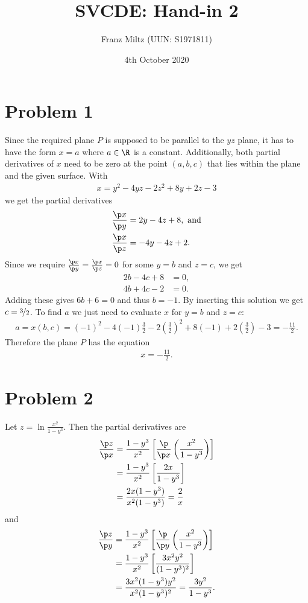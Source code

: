 \documentclass{article}
\begin{document}
\title{SVCDE: Hand-in 2}
\author{Franz Miltz (UUN: S1971811)}
\date{4th October 2020}
\maketitle
\section*{Problem 1}
Since the required plane $P$ is supposed to be parallel to the $yz$ plane, it
has to have the form $x=a$ where $a\in\R$ is a constant.
Additionally, both partial derivatives of $x$ need to be zero at the
point $(a,b,c)$ that lies within the plane and the given surface.
With
\begin{align*}
  x = y^2 - 4yz - 2z^2 + 8y + 2z -3
\end{align*}
we get the partial derivatives
\begin{align*}
  \frac{\p x}{\p y} & =2y - 4z + 8,\text{ and} \\
  \frac{\p x}{\p z} & =-4y-4z+2.
\end{align*}
Since we require $\frac{\p x}{\p y}=\frac{\p x}{\p z}=0$ for
some $y=b$ and $z=c$, we get
\begin{align*}
  2b - 4c + 8 & = 0, \\
  4b + 4c - 2 & = 0.
\end{align*}
Adding these gives $6b + 6 = 0$ and thus $b=-1$.
By inserting this solution we get $c=\nicefrac{3}{2}$.
To find $a$ we just need to evaluate $x$ for $y=b$ and $z=c$:
\begin{align*}
  a = x(b,c) = (-1)^2 - 4(-1)\frac{3}{2} - 2\left(\frac{3}{2}\right)^2
  + 8(-1) + 2\left(\frac{3}{2}\right) - 3 = - \frac{11}{2}.
\end{align*}
Therefore the plane $P$ has the equation
\begin{align*}
  x = -\frac{11}{2}.
\end{align*}
\section*{Problem 2}
Let $ z = \ln\frac{x^2}{1-y^3}$. Then the partial derivatives are
\begin{align*}
  \frac{\p z}{\p x}
   & =\frac{1-y^3}{x^2}\left[\frac{\p}{\p x}\left(\frac{x^2}{1-y^3}\right)\right] \\
   & =\frac{1-y^3}{x^2}\left[\frac{2x}{1-y^3}\right]                              \\
   & =\frac{2x(1-y^3)}{x^2(1-y^3)}=\frac{2}{x}
\end{align*}
and
\begin{align*}
  \frac{\p z}{\p y}
   & =\frac{1-y^3}{x^2}\left[\frac{\p}{\p y}\left( \frac{x^2}{1-y^3}\right)\right] \\
   & =\frac{1-y^3}{x^2}\left[\frac{3x^2y^2}{(1-y^3)^2}\right]                      \\
   & =\frac{3x^2(1-y^3)y^2}{x^2(1-y^3)^2} =\frac{3y^2}{1-y^3}.
\end{align*}
\end{document}
